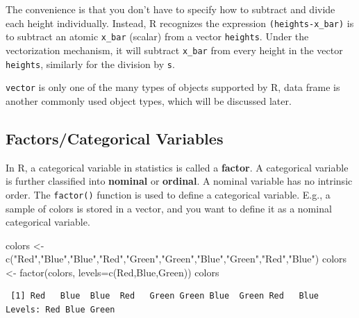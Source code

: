 \documentclass[
  letterpaper,
]{book}
\newenvironment{Shaded}{\begin{snugshade}}{\end{snugshade}}
\newcommand{\AttributeTok}[1]{\textcolor[rgb]{0.40,0.45,0.13}{#1}}
\newcommand{\FunctionTok}[1]{\textcolor[rgb]{0.28,0.35,0.67}{#1}}
\newcommand{\NormalTok}[1]{\textcolor[rgb]{0.00,0.23,0.31}{#1}}
\newcommand{\OtherTok}[1]{\textcolor[rgb]{0.00,0.23,0.31}{#1}}
\newcommand{\StringTok}[1]{\textcolor[rgb]{0.13,0.47,0.30}{#1}}
\begin{document}
The convenience is that you don't have to specify how to subtract and
divide each height individually. Instead, R recognizes the expression
\texttt{(heights-x\_bar)} is to subtract an atomic \texttt{x\_bar}
(scalar) from a vector \texttt{heights}. Under the vectorization
mechanism, it will subtract \texttt{x\_bar} from every height in the
vector \texttt{heights}, similarly for the division by \texttt{s}.

\texttt{vector} is only one of the many types of objects supported by R,
data frame is another commonly used object types, which will be
discussed later.

\subsection*{Factors/Categorical Variables}\label{factor-levels}

In R, a categorical variable in statistics is called a \textbf{factor}.
A categorical variable is further classified into \textbf{nominal} or
\textbf{ordinal}. A nominal variable has no intrinsic order. The
\texttt{factor()} function is used to define a categorical variable.
E.g., a sample of colors is stored in a vector, and you want to define
it as a nominal categorical variable.

\begin{Shaded}
\begin{Highlighting}[]
\NormalTok{colors }\OtherTok{\textless{}{-}} \FunctionTok{c}\NormalTok{(}\StringTok{"Red"}\NormalTok{,}\StringTok{"Blue"}\NormalTok{,}\StringTok{"Blue"}\NormalTok{,}\StringTok{"Red"}\NormalTok{,}\StringTok{"Green"}\NormalTok{,}\StringTok{"Green"}\NormalTok{,}\StringTok{"Blue"}\NormalTok{,}\StringTok{"Green"}\NormalTok{,}\StringTok{"Red"}\NormalTok{,}\StringTok{"Blue"}\NormalTok{)}
\NormalTok{colors }\OtherTok{\textless{}{-}} \FunctionTok{factor}\NormalTok{(colors, }\AttributeTok{levels=}\FunctionTok{c}\NormalTok{(}\StringTok{\textquotesingle{}Red\textquotesingle{}}\NormalTok{,}\StringTok{\textquotesingle{}Blue\textquotesingle{}}\NormalTok{,}\StringTok{\textquotesingle{}Green\textquotesingle{}}\NormalTok{))}
\NormalTok{colors}
\end{Highlighting}
\end{Shaded}

\begin{verbatim}
 [1] Red   Blue  Blue  Red   Green Green Blue  Green Red   Blue 
Levels: Red Blue Green
\end{verbatim}
\end{document}
